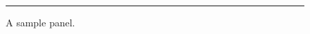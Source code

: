 \begin{figure}[tb]%
  \begin{minipage}[t]{.45\linewidth}
    \rule{1cm}{1cm}

    \small A sample panel.
  \end{minipage}%
\end{figure}%
